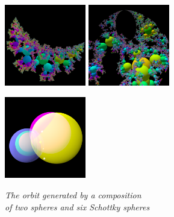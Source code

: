 \begin{figure}[h!tbp]
 \begin{minipage}[t]{0.5\hsize}
  \begin{minipage}[t]{0.25\hsize}
   \center
   \includegraphics[width=1.4in, height=1.4in, keepaspectratio]{./img/application/3dGen/loxoOrbSch.pdf}
  \end{minipage}
  \hspace*{\fill}
  \begin{minipage}[t]{0.25\hsize}
   \center
   \includegraphics[width=1.4in, height=1.4in, keepaspectratio]{./img/application/3dGen/parabolicOrb.pdf}
  \end{minipage}
  \hspace*{\fill}
  \caption{\textit{The orbit generated by a composition \\of two spheres and six Schottky
  spheres}}
  \label{fig:complicated3d}
 \end{minipage}
 \hspace*{\fill}
 \begin{minipage}[t]{0.5\hsize}
  \begin{minipage}[t]{0.25\hsize}
   \center
   \includegraphics[width=1.4in, height=1.4in, keepaspectratio]{./img/application/3dGen/compLoxoOneGen.pdf}
   \label{fig:compLoxoGen}
  \end{minipage}

\end{minipage}
\end{figure}
